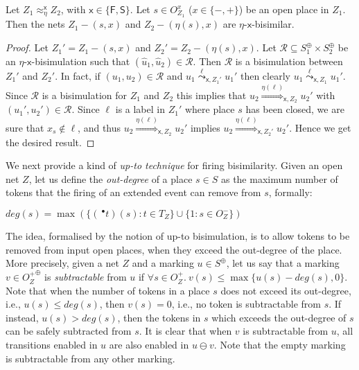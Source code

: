 \documentclass{LMCS}
\newcommand{\degree}[1]{\ensuremath{deg}({#1})}
\newcommand{\init}[1]{\hat{#1}}
\newcommand{\mon}[1]{\ensuremath{{#1}^\oplus}}
\newcommand{\monSub}[2]{\ensuremath{{#1}_{#2}^\oplus}}
\newcommand{\pre}[1][(\cdot)]{\ensuremath{\!~^\bullet{#1}}}
\newcommand{\wltr}[3][x]{\ensuremath{\stackrel{{#3}}{\leadsto}_{\mathsf{#1},#2}}}
\newcommand{\Ltr}[3][x]{\ensuremath{\stackrel{{#3}}{\Longrightarrow}_{\mathsf{#1},#2}}}
\begin{document}
\begin{prop}
  \label{pr:closing}
  Let $Z_1 \approx_\eta^\mathsf{x} Z_2$, with $\mathsf{x} \in \{
  \mathsf{F}, \mathsf{S} \}$. Let $s \in O_{Z_1}^x$ ($x \in \{ -, +\}$) be
  an open place in $Z_1$. Then the nets $Z_1-(s,x)$ and
  $Z_2-(\eta(s),x)$ are $\eta$-$\mathsf{x}$-bisimilar.
\end{prop}


\begin{proof}
  Let $Z_1' = Z_1-(s,x)$ and $Z_2' = Z_2-(\eta(s),x)$. Let
  $\mathcal{R} \subseteq \monSub{S}{1} \times \monSub{S}{2}$ be an
  $\eta$-$\mathsf{x}$-bisimulation such that $(\init{u}_1, \init{u}_2)
  \in \mathcal{R}$.
Then $\mathcal{R}$ is a bisimulation between $Z_1'$ and
  $Z_2'$.  In fact, if $(u_1,u_2) \in \mathcal{R}$ and $u_1
  \wltr{Z_1'}{\ell} u_1'$ then clearly $u_1 \wltr{Z_1}{\ell} u_1'$. Since
  $\mathcal{R}$ is a bisimulation for $Z_1$ and $Z_2$ this implies
  that $u_2 \Ltr{Z_2}{\eta(\ell)} u_2'$ with $(u_1', u_2') \in
  \mathcal{R}$. Since $\ell$ is a label in $Z_1'$ where place $s$ has
  been closed, we are sure that $x_s \not\in \ell$, and thus $u_2
  \Ltr{Z_2}{\eta(\ell)} u_2'$ implies $u_2 \Ltr{Z_2'}{\eta(\ell)} u_2'$.
Hence we get the desired result.
\end{proof}





We next provide a kind of \emph{up-to technique} for firing
bisimilarity. Given an open net $Z$, let us define the
\emph{out-degree} of a place $s \in S$  as
the maximum number of tokens that the firing of an extended event
can remove from $s$, formally: 

\begin{center}
  $\degree{s} = \max \left( \{ (\pre[t])(s) : t \in T_Z \} \cup
    \{ 1 : s \in O_Z^- \} \right)$ 
\end{center}

The idea, formalised by the notion of up-to bisimulation, is to allow
tokens to be removed from input open places, when they exceed the
out-degree of the place. More precisely, given a net $Z$ and a marking
$u \in \mon{S}$, let us say that a marking $v \in \mon{O_Z^+}$ is
\emph{subtractable} from $u$ if $\forall s \in O_Z^+.\ v(s) \leq
\max\{ u(s) - \degree{s}, 0 \}$. 
Note that when the number of tokens in a place $s$ does not exceed its
out-degree, i.e., $u(s) \leq \degree{s}$, then $v(s) =0$, i.e., no
token is subtractable from $s$. If instead, $u(s) > \degree{s}$, then
the tokens in $s$ which exceeds the out-degree of $s$ can be safely
subtracted from $s$.
It is clear that when $v$ is subtractable from $u$, all transitions
enabled in $u$ are also enabled in $u \ominus v$.
Note that the empty marking is subtractable from any other marking.
\end{document}
